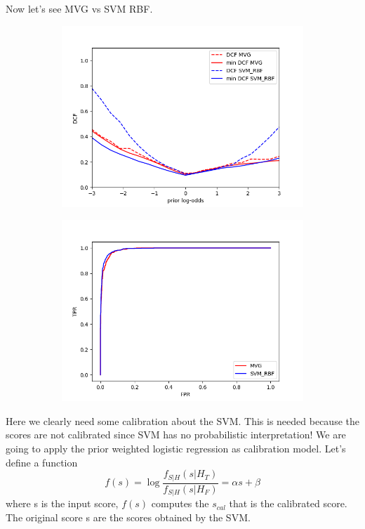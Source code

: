 \documentclass[english]{report}
\begin{document}
Now let's see MVG vs SVM RBF\@.

\begin{figure}[h!]
    \begin{subfigure}{0.5\textwidth}
        \includegraphics[scale=0.5]{../../images/comparison/validation/DCF_MVG&SVM_RBF}
    \end{subfigure}
    \begin{subfigure}{0.5\textwidth}
        \includegraphics[scale=0.5]{../../images/comparison/validation/ROC_MVG&SVM_RBF}
    \end{subfigure}
    \label{fig:MVGvsSVM}
\end{figure}
Here we clearly need some calibration about the SVM. This is needed because the scores are not calibrated
since SVM has no probabilistic interpretation!
We are going to apply the prior weighted logistic regression as calibration model.
Let's define a function \[f(s) = \log\frac{f_{S|H}(s|H_T)}{f_{S|H}(s|H_F)} = \alpha s + \beta\]
where s is the input score, $f(s)$ computes the $s_{cal}$ that is the calibrated score.
The original score s are the scores obtained by the SVM\@.
\end{document}
